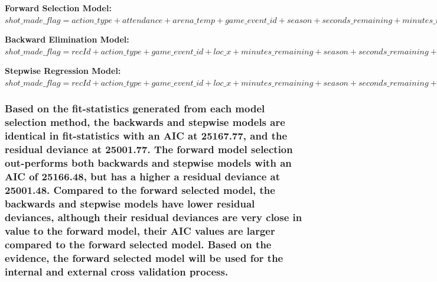 \documentclass[american,]{article}
\begin{document}
\textbf{Forward Selection Model:}
\(shot\_made\_flag = action\_type + attendance + arena\_temp + game\_event\_id + season + seconds\_remaining + minutes\_remaining + loc\_y + game\_date + loc\_x\)

\textbf{Backward Elimination Model:}
\(shot\_made\_flag = recId + action\_type + game\_event\_id + loc\_x + minutes\_remaining + season + seconds\_remaining + shot\_distance + game\_date + shot\_id + attendance + arena\_temp\)

\textbf{Stepwise Regression Model:}
\(shot\_made\_flag = recId + action\_type + game\_event\_id + loc\_x + minutes\_remaining + season + seconds\_remaining + shot\_distance + game\_date + shot\_id + attendance + arena\_temp\)

\hypertarget{based-on-the-fit-statistics-generated-from-each-model-selection-method-the-backwards-and-stepwise-models-are-identical-in-fit-statistics-with-an-aic-at-25167.77-and-the-residual-deviance-at-25001.77.-the-forward-model-selection-out-performs-both-backwards-and-stepwise-models-with-an-aic-of-25166.48-but-has-a-higher-a-residual-deviance-at-25001.48.-compared-to-the-forward-selected-model-the-backwards-and-stepwise-models-have-lower-residual-deviances-although-their-residual-deviances-are-very-close-in-value-to-the-forward-model-their-aic-values-are-larger-compared-to-the-forward-selected-model.-based-on-the-evidence-the-forward-selected-model-will-be-used-for-the-internal-and-external-cross-validation-process.}{%
\subsubsection{Based on the fit-statistics generated from each model selection method, the backwards and stepwise models are identical in fit-statistics with an AIC at 25167.77, and the residual deviance at 25001.77. The forward model selection out-performs both backwards and stepwise models with an AIC of 25166.48, but has a higher a residual deviance at 25001.48. Compared to the forward selected model, the backwards and stepwise models have lower residual deviances, although their residual deviances are very close in value to the forward model, their AIC values are larger compared to the forward selected model. Based on the evidence, the forward selected model will be used for the internal and external cross validation process.}\label{based-on-the-fit-statistics-generated-from-each-model-selection-method-the-backwards-and-stepwise-models-are-identical-in-fit-statistics-with-an-aic-at-25167.77-and-the-residual-deviance-at-25001.77.-the-forward-model-selection-out-performs-both-backwards-and-stepwise-models-with-an-aic-of-25166.48-but-has-a-higher-a-residual-deviance-at-25001.48.-compared-to-the-forward-selected-model-the-backwards-and-stepwise-models-have-lower-residual-deviances-although-their-residual-deviances-are-very-close-in-value-to-the-forward-model-their-aic-values-are-larger-compared-to-the-forward-selected-model.-based-on-the-evidence-the-forward-selected-model-will-be-used-for-the-internal-and-external-cross-validation-process.}}
\end{document}
